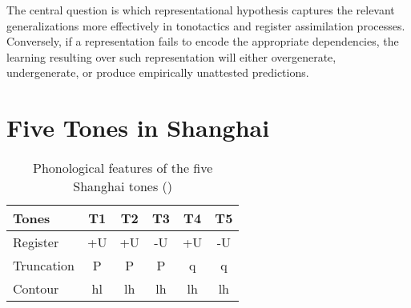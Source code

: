 \documentclass[11pt]{article}
\begin{document}
The central question is which representational hypothesis captures the relevant 
generalizations more effectively in tonotactics and register assimilation processes. 
Conversely, if a representation fails to encode the appropriate dependencies, 
the learning resulting over such representation will either overgenerate, 
undergenerate, or produce empirically unattested predictions.




\section{Five Tones in Shanghai}
\begin{table}[h!]
	\centering
	\caption{Phonological features of the five Shanghai tones (\citep{zhu1999shanghai})} 
	\begin{tabular}{lccccc}
		\toprule
		\textbf{Tones} & \textbf{T1} & \textbf{T2} & \textbf{T3} & \textbf{T4} & \textbf{T5} \\
		\midrule
		Register   & +U & +U & -U & +U & -U \\
		Truncation & P  & P  & P  & q  & q  \\
		Contour    & hl & lh & lh & lh & lh \\
		\bottomrule
	\end{tabular}
\end{table}



\end{document}
